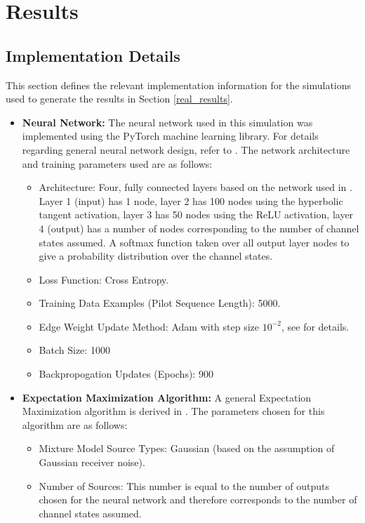 \section{Results}

\subsection{Implementation Details}\label{implementation_details}
This section defines the relevant implementation information for the simulations used to generate the results in Section \ref{real_results}.

\begin{itemize}
\item \textbf{Neural Network:}
The neural network used in this simulation was implemented using the PyTorch machine learning library. For details regarding general neural network design, refer to \cite{Goodfellow-et-al-2016}. The network architecture and training parameters used are as follows:
\begin{itemize}
\item Architecture: Four, fully connected layers based on the network used in  \cite{shlezinger2019viterbinet}. Layer 1 (input) has 1 node, layer 2 has 100 nodes using the hyperbolic tangent activation, layer 3 has 50 nodes using the ReLU activation, layer 4 (output) has a number of nodes corresponding to the number of channel states assumed. A softmax function taken over all output layer nodes to give a probability distribution over the channel states. 
\item Loss Function: Cross Entropy.
\item Training Data Examples (Pilot Sequence Length): 5000.
\item Edge Weight Update Method: Adam with step size $10^{-2}$, see \cite{kingma2014adam} for details.
\item Batch Size: 1000 
\item Backpropogation Updates (Epochs): 900
\end{itemize}
\item \textbf{Expectation Maximization Algorithm:} A general Expectation Maximization algorithm is derived in \cite{ng2000cs229}. The parameters chosen for this algorithm are as follows:
\begin{itemize}
\item Mixture Model Source Types: Gaussian (based on the assumption of Gaussian receiver noise).
\item Number of Sources: This number is equal to the number of outputs chosen for the neural network and therefore corresponds to the number of channel states assumed.

\end{itemize}
\end{itemize}
